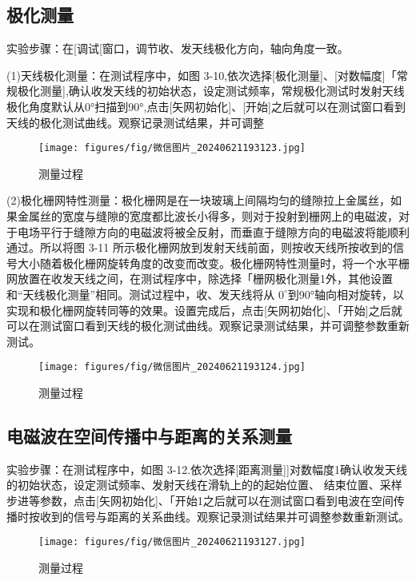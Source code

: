 \documentclass[12pt,hyperref,a4paper,UTF8]{ctexart}
\begin{document}
\subsection{极化测量}

实验步骤：在[调试[窗口，调节收、发天线极化方向，轴向角度一致。

(1)天线极化测量：在测试程序中，如图 3-10,依次选择[极化测量]、[对数幅度]「常规极化测量],确认收发天线的初始状态，设定测试频率，常规极化测试时发射天线极化角度默认从0°扫描到90°,点击[矢网初始化]、[开始]之后就可以在测试窗口看到天线的极化测试曲线。观察记录测试结果，并可调整

\begin{figure}[H]
    \centering
    \texttt{[image: figures/fig/微信图片\_20240621193123.jpg]}
    \caption{测量过程}
\end{figure}


(2)极化栅网特性测量：极化栅网是在一块玻璃上间隔均匀的缝隙拉上金属丝，如果金属丝的宽度与缝隙的宽度都比波长小得多，则对于投射到栅网上的电磁波，对于电场平行于缝隙方向的电磁波将被全反射，而垂直于缝隙方向的电磁波将能顺利通过。所以将图 3-11 所示极化栅网放到发射天线前面，则按收天线所按收到的信号大小随着极化栅网旋转角度的改变而改变。极化栅网特性测量时，将一个水平栅网放置在收发天线之间，在测试程序中，除选择「栅网极化测量1外，其他设置和“天线极化测量”相同。测试过程中，收、发天线将从
$0^{\circ}$到90°轴向相对旋转，以实现和极化栅网旋转同等的效果。设置完成后，点击[矢网初始化]、「开始]之后就可以在测试窗口看到天线的极化测试曲线。观察记录测试结果，并可调整参数重新测试。

\begin{figure}[H]
    \centering
    \texttt{[image: figures/fig/微信图片\_20240621193124.jpg]}
    \caption{测量过程}
\end{figure}


\subsection{电磁波在空间传播中与距离的关系测量}

实验步骤：在测试程序中，如图 3-12.依次选择[距离测量]]对数幅度1确认收发天线的初始状态，设定测试频率、发射天线在滑轨上的的起始位置、 结束位置、采样步进等参数，点击[矢网初始化]、「开始1之后就可以在测试窗口看到电波在空间传播时按收到的信号与距离的关系曲线。观察记录测试结果并可调整参数重新测试。

\begin{figure}[H]
    \centering
    \texttt{[image: figures/fig/微信图片\_20240621193127.jpg]}
    \caption{测量过程}
\end{figure}
\end{document}
